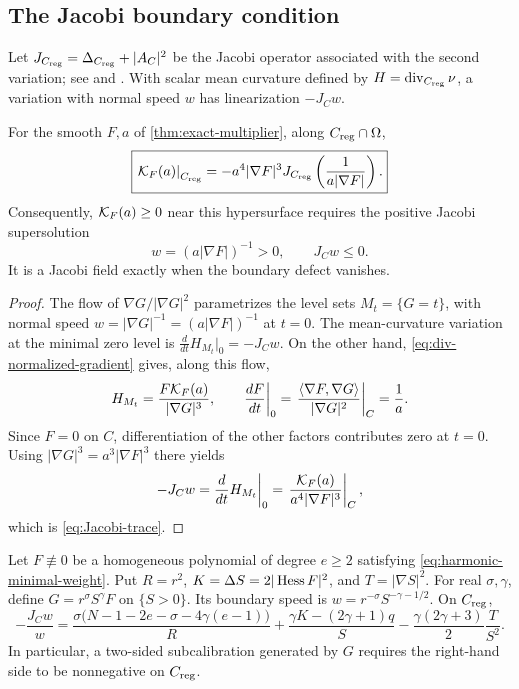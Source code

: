 \subsection{The Jacobi boundary condition}
\label{sec:jacobi-boundary-condition}

Let \(J_{C_{\rm reg}}=\Delta_{C_{\rm reg}}+|A_C|^2\)
be the Jacobi operator associated with the second variation; see
\cite{Simons68} and \cite[Remark~9.8]{Simon83}. With scalar mean curvature
defined by \(H=\operatorname{div}_{C_{\rm reg}}\nu\), a variation with normal
speed \(w\) has linearization \(-J_Cw\).

\begin{theorem}
\label{thm:Jacobi-trace}
For the smooth \(F,a\) of \cref{thm:exact-multiplier}, along
\(C_{\mathrm{reg}}\cap\Omega\),
\begin{equation}\label{eq:Jacobi-trace}
 \boxed{
 \left.\mathcal K_F(a)\right|_{C_{\rm reg}}
 =-a^4|\nabla F|^3J_{C_{\rm reg}}
 \left(\frac1{a|\nabla F|}\right).}
\end{equation}
Consequently, \(\mathcal K_F(a)\geq0\) near this hypersurface requires the positive
Jacobi supersolution
\begin{equation}\label{eq:positive-Jacobi}
 w=(a|\nabla F|)^{-1}>0,
 \qquad J_Cw\leq0.
\end{equation}
It is a Jacobi field exactly when the boundary defect vanishes.
\end{theorem}

\begin{proof}
The flow of \(\nabla G/|\nabla G|^2\) parametrizes the level sets
\(M_t=\{G=t\}\), with normal speed
\(w=|\nabla G|^{-1}=(a|\nabla F|)^{-1}\) at \(t=0\).
The mean-curvature variation at the minimal zero level is
\(\frac{d}{dt}H_{M_t}|_0=-J_Cw\).
On the other hand, \eqref{eq:div-normalized-gradient} gives, along this flow,
\[
 H_{M_t}=\frac{F\mathcal K_F(a)}{|\nabla G|^3},\qquad
 \frac{dF}{dt}\bigg|_0
 =\left.\frac{\langle\nabla F,\nabla G\rangle}{|\nabla G|^2}\right|_C
 =\frac1a.
\]
Since \(F=0\) on \(C\), differentiation of the other factors contributes
zero at \(t=0\).  Using \(|\nabla G|^3=a^3|\nabla F|^3\) there yields
\[
 -J_Cw=\frac{d}{dt}H_{M_t}\bigg|_0
 =\left.\frac{\mathcal K_F(a)}{a^4|\nabla F|^3}\right|_C,
\]
which is \eqref{eq:Jacobi-trace}.
\end{proof}

\begin{proposition}
\label{prop:harmonic-power-Jacobi}
Let \(F\not\equiv0\) be a homogeneous polynomial of degree \(e\ge2\) satisfying
\eqref{eq:harmonic-minimal-weight}. Put \(R=r^2\),
\(K=\Delta S=2|\operatorname{Hess} F|^2\), and \(T=|\nabla S|^2\).
For real \(\sigma,\gamma\), define \(G=r^\sigma S^\gamma F\) on
\(\{S>0\}\). Its boundary speed is \(w=r^{-\sigma}S^{-\gamma-1/2}\).
On \(C_{\mathrm{reg}}\),
\begin{equation}\label{eq:harmonic-power-Jacobi}
 -\frac{J_Cw}{w}
 =\frac{\sigma\bigl(N-1-2e-\sigma-4\gamma(e-1)\bigr)}{R}
  +\frac{\gamma K-(2\gamma+1)q}{S}
  -\frac{\gamma(2\gamma+3)}2\frac{T}{S^2}.
\end{equation}
In particular, a two-sided subcalibration generated by \(G\) requires
the right-hand side to be nonnegative on \(C_{\mathrm{reg}}\).
\end{proposition}

